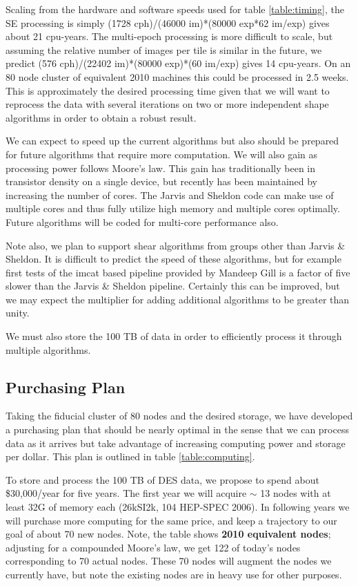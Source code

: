\documentclass[12pt]{article}
\begin{document}
Scaling from the hardware and software speeds used for table
\ref{table:timing}, the SE processing is simply (1728 cph)/(46000 im)*(80000
exp*62 im/exp) gives about 21 cpu-years.  The multi-epoch processing is more
difficult to scale, but assuming the relative number of images per tile is
similar in the future, we predict (576 cph)/(22402 im)*(80000 exp)*(60 im/exp)
gives 14 cpu-years.  On an 80 node cluster of equivalent 2010 machines this
could be processed in 2.5 weeks.  This is approximately the desired processing
time given that we will want to reprocess the data with several iterations on
two or more independent shape algorithms in order to obtain a robust result.

We can expect to speed up the current algorithms but also should be prepared
for future algorithms that require more computation.  We will also gain as
processing power follows Moore's law. This gain has traditionally been in
transistor density on a single device, but recently has been maintained by
increasing the number of cores.  The Jarvis and Sheldon code can make use of
multiple cores and thus fully utilize high memory and multiple cores optimally.
Future algorithms will be coded for multi-core performance also.

Note also, we plan to support shear algorithms from groups other than Jarvis \&
Sheldon.  It is difficult to predict the speed of these algorithms, but for
example first tests of the imcat based pipeline provided by Mandeep Gill is a
factor of five slower than the Jarvis \& Sheldon pipeline.  Certainly this can
be improved, but we may expect the multiplier for adding additional algorithms
to be greater than unity.

We must also store the 100 TB of data in order to efficiently process it
through multiple algorithms.  


\subsection{Purchasing Plan}

Taking the fiducial cluster of 80 nodes and the desired storage, we have
developed a purchasing plan that should be nearly optimal in the sense that
we can process data as it arrives but take advantage of increasing computing
power and storage per dollar.  This plan is outlined in table \ref{table:computing}.

To store and process the 100 TB of DES data, we propose to spend about
\$30,000/year for five years. The first year we will acquire $\sim$ 13 nodes
with at least 32G of memory each (26kSI2k, 104 HEP-SPEC 2006).  In following
years we will purchase more computing for the same price, and keep a trajectory
to our goal of about 70 new nodes.  Note, the table shows {\bf 2010 equivalent
nodes}; adjusting for a compounded Moore's law, we get 122 of today's nodes
corresponding to 70 actual nodes.  These 70 nodes will augment the  nodes we
currently have, but note the existing nodes are in heavy use for other
purposes.
\end{document}

